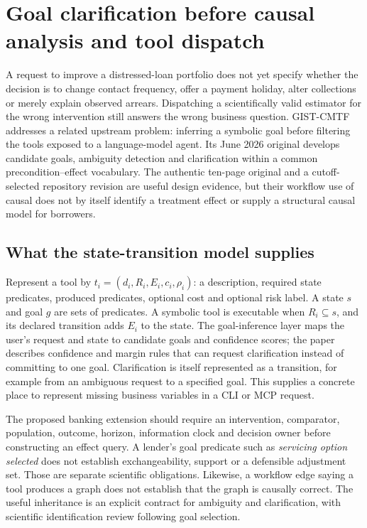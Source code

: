 \section{Goal clarification before causal analysis and tool dispatch}
\label{exec23:gist-scope}
A request to improve a distressed-loan portfolio does not yet specify whether
the decision is to change contact frequency, offer a payment holiday, alter
collections or merely explain observed arrears. Dispatching a scientifically
valid estimator for the wrong intervention still answers the wrong business
question. GIST-CMTF addresses a related upstream problem: inferring a symbolic
goal before filtering the tools exposed to a language-model agent. Its June
2026 original develops candidate goals, ambiguity detection and clarification
within a common precondition--effect vocabulary. The authentic ten-page
original and a cutoff-selected repository revision are useful design evidence,
but their workflow use of causal does not by itself identify a treatment effect
or supply a structural causal model for borrowers.
\citep{exec23_gist_paper,exec23_gist_sources}

\subsection{What the state-transition model supplies}
\label{exec23:gist-model}
Represent a tool by $t_i=(d_i,R_i,E_i,c_i,\rho_i)$: a description, required
state predicates, produced predicates, optional cost and optional risk label.
A state $s$ and goal $g$ are sets of predicates. A symbolic tool is executable
when $R_i\subseteq s$, and its declared transition adds $E_i$ to the state.
The goal-inference layer maps the user's request and state to candidate goals
and confidence scores; the paper describes confidence and margin rules that
can request clarification instead of committing to one goal. Clarification is
itself represented as a transition, for example from an ambiguous request to
a specified goal. This supplies a concrete place to represent missing business
variables in a CLI or MCP request.
\citep{exec23_gist_paper}

The proposed banking extension should require an intervention, comparator,
population, outcome, horizon, information clock and decision owner before
constructing an effect query. A lender's goal predicate such as
\emph{servicing option selected} does not establish exchangeability, support
or a defensible adjustment set. Those are separate scientific obligations.
Likewise, a workflow edge saying a tool produces a graph does not establish
that the graph is causally correct. The useful inheritance is an explicit
contract for ambiguity and clarification, with scientific identification
review following goal selection.
\citep{exec23_gist_paper,exec23_gist_sources}

